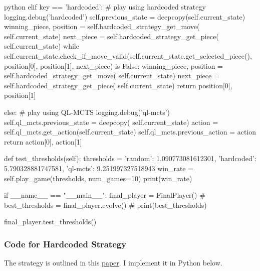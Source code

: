 \begin{mintedbox}{python}
            elif key == 'hardcoded':
                # play using hardcoded strategy
                logging.debug('hardcoded')
                self.previous_state = deepcopy(self.current_state)
                winning_piece, position = self.hardcoded_strategy_get_move(
                    self.current_state)
                next_piece = self.hardcoded_strategy_get_piece(
                    self.current_state)
                while self.current_state.check_if_move_valid(self.current_state.get_selected_piece(), position[0], position[1], next_piece) is False:
                    winning_piece, position = self.hardcoded_strategy_get_move(
                        self.current_state)
                    next_piece = self.hardcoded_strategy_get_piece(
                        self.current_state)
                return position[0], position[1]

            else:
                # play using QL-MCTS
                logging.debug('ql-mcts')
                self.ql_mcts.previous_state = deepcopy(
                    self.current_state)
                action = self.ql_mcts.get_action(self.current_state)
                self.ql_mcts.previous_action = action
                return action[0], action[1]

    def test_thresholds(self):
        thresholds = {'random': 1.090773081612301,
                        'hardcoded': 5.790328881747581, 'ql-mcts': 9.251997327518943}
        win_rate = self.play_game(thresholds, num_games=10)
        print(win_rate)


if __name__ == "__main__":
    final_player = FinalPlayer()
    # best_thresholds = final_player.evolve()
    # print(best_thresholds)

    final_player.test_thresholds()
\end{mintedbox}

\subsubsection{Code for Hardcoded Strategy}

The strategy is outlined in this \href{https://scholarworks.umt.edu/cgi/viewcontent.cgi?article=1334&context=tme}{paper}. I implement it in Python below.

